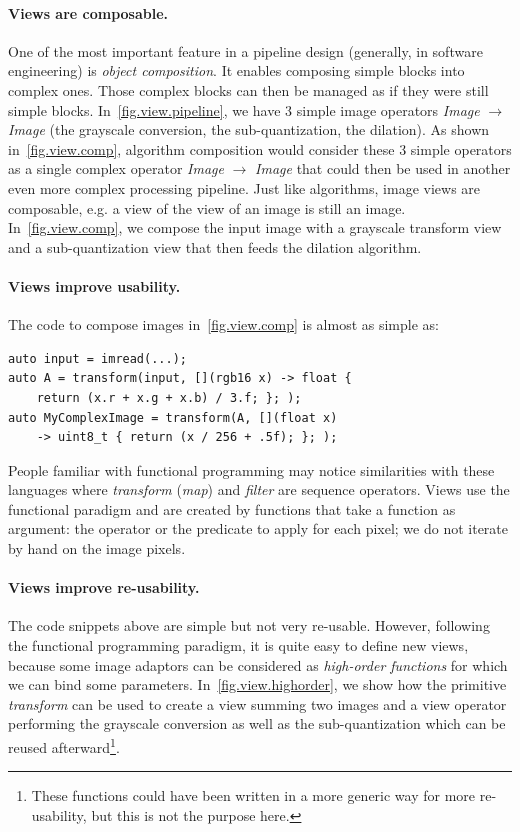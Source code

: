 \paragraph{Views are composable.} One of the most important feature in a pipeline design (generally, in software
engineering) is \emph{object composition}. It enables composing simple blocks into complex ones. Those complex blocks
can then be managed as if they were still simple blocks. In~\cref{fig.view.pipeline}, we have 3 simple image operators
\emph{Image} $\rightarrow$ \emph{Image} (the grayscale conversion, the sub-quantization, the dilation). As shown
in~\cref{fig.view.comp}, algorithm composition would consider these 3 simple operators as a single complex operator
\emph{Image} $\rightarrow$ \emph{Image} that could then be used in another even more complex processing pipeline. Just
like algorithms, image views are composable, e.g. a view of the view of an image is still an image.
In~\cref{fig.view.comp}, we compose the input image with a grayscale transform view and a sub-quantization view that
then feeds the dilation algorithm.

\paragraph{Views improve usability.} The code to compose images in~\cref{fig.view.comp} is almost as simple as:

\begin{minipage}{\linewidth}
  \begin{verbatim}
auto input = imread(...);
auto A = transform(input, [](rgb16 x) -> float {
    return (x.r + x.g + x.b) / 3.f; }; );
auto MyComplexImage = transform(A, [](float x)
    -> uint8_t { return (x / 256 + .5f); }; );
  \end{verbatim}
  \smallskip
\end{minipage}

People familiar with functional programming may notice similarities with these languages where \emph{transform}
(\emph{map}) and \emph{filter} are sequence operators. Views use the functional paradigm and are created by functions
that take a function as argument: the operator or the predicate to apply for each pixel; we do not iterate by hand on
the image pixels.

\paragraph{Views improve re-usability.} The code snippets above are simple but not very re-usable. However, following the
functional programming paradigm, it is quite easy to define new views, because some image adaptors can be considered as
\emph{high-order functions} for which we can bind some parameters. In~\cref{fig.view.highorder}, we show how the
primitive \emph{transform} can be used to create a view summing two images and a view operator performing the grayscale
conversion as well as the sub-quantization which can be reused afterward\footnote{These functions could have been
  written in a more generic way for more re-usability, but this is not the purpose here.}.

